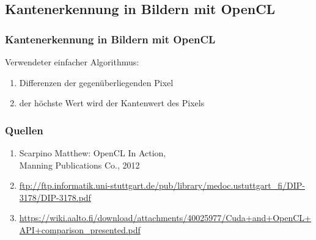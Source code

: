 \documentclass{beamer}
\begin{document}
\subsection{Kantenerkennung in Bildern mit OpenCL}
\begin{frame}
\frametitle{Kantenerkennung in Bildern mit OpenCL}
Verwendeter einfacher Algorithmus:
\begin{enumerate}
\item Differenzen der gegenüberliegenden Pixel
\item der höchste Wert wird der Kantenwert des Pixels
\end{enumerate}
\end{frame}

\begin{appendix}
\begin{frame}
\frametitle{Quellen}
\begin{enumerate}
\item Scarpino Matthew: OpenCL In Action, \\Manning Publications Co., 2012
\item \url{ftp://ftp.informatik.uni-stuttgart.de/pub/library/medoc.ustuttgart_fi/DIP-3178/DIP-3178.pdf}
\item \url{https://wiki.aalto.fi/download/attachments/40025977/Cuda+and+OpenCL+API+comparison_presented.pdf}
\end{enumerate}
\end{frame}
\end{appendix}
\end{document}
